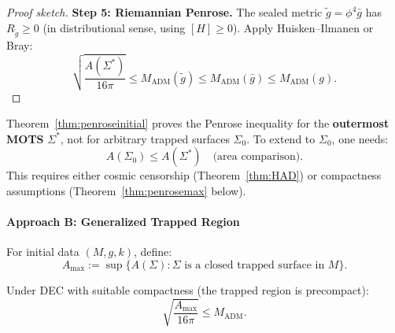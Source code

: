 \begin{proof}[Proof sketch]
\textbf{Step 5: Riemannian Penrose.}
The sealed metric $\tilde{g} = \phi^4 \bar{g}$ has $R_{\tilde{g}} \geq 0$ (in distributional sense, using $[H] \geq 0$). Apply Huisken--Ilmanen or Bray:
\begin{equation}
    \sqrt{\frac{A(\Sigma^*)}{16\pi}} \leq M_{\mathrm{ADM}}(\tilde{g}) \leq M_{\mathrm{ADM}}(\bar{g}) \leq M_{\mathrm{ADM}}(g).
\end{equation}
\end{proof}

\begin{remark}\label{rem:MOTSvsTrapped}
Theorem~\ref{thm:penroseinitial} proves the Penrose inequality for the \textbf{outermost MOTS} $\Sigma^*$, not for arbitrary trapped surfaces $\Sigma_0$. To extend to $\Sigma_0$, one needs:
\begin{equation}
    A(\Sigma_0) \leq A(\Sigma^*) \quad \text{(area comparison)}.
\end{equation}
This requires either cosmic censorship (Theorem~\ref{thm:HAD}) or compactness assumptions (Theorem~\ref{thm:penrosemax} below).
\end{remark}

\paragraph{Approach B: Generalized Trapped Region}

\begin{definition}\label{def:maxtrapped}
For initial data $(M, g, k)$, define:
\begin{equation}
    A_{\max} := \sup\{A(\Sigma) : \Sigma \text{ is a closed trapped surface in } M\}.
\end{equation}
\end{definition}

\begin{theorem}\label{thm:penrosemax}
Under DEC with suitable compactness (the trapped region is precompact):
\begin{equation}
    \sqrt{\frac{A_{\max}}{16\pi}} \leq M_{\mathrm{ADM}}.
\end{equation}
\end{theorem}

